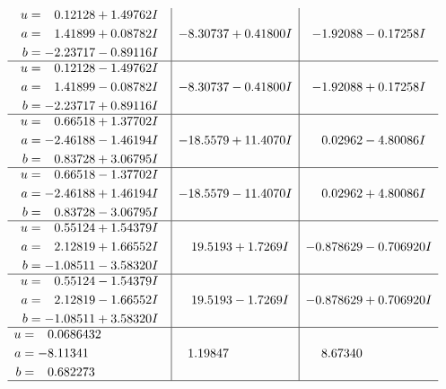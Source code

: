 \documentclass[1p]{elsarticle_modified}
\theoremstyle{definition}
\begin{document}
$$\begin{array}{c|c|c}
\begin{aligned}
u &= \phantom{-}0.12128 + 1.49762 I \\
a &= \phantom{-}1.41899 + 0.08782 I \\
b &= -2.23717 - 0.89116 I\end{aligned}
 & -8.30737 + 0.41800 I & -1.92088 - 0.17258 I \\ \hline\begin{aligned}
u &= \phantom{-}0.12128 - 1.49762 I \\
a &= \phantom{-}1.41899 - 0.08782 I \\
b &= -2.23717 + 0.89116 I\end{aligned}
 & -8.30737 - 0.41800 I & -1.92088 + 0.17258 I \\ \hline\begin{aligned}
u &= \phantom{-}0.66518 + 1.37702 I \\
a &= -2.46188 - 1.46194 I \\
b &= \phantom{-}0.83728 + 3.06795 I\end{aligned}
 & -18.5579 + 11.4070 I & \phantom{-}0.02962 - 4.80086 I \\ \hline\begin{aligned}
u &= \phantom{-}0.66518 - 1.37702 I \\
a &= -2.46188 + 1.46194 I \\
b &= \phantom{-}0.83728 - 3.06795 I\end{aligned}
 & -18.5579 - 11.4070 I & \phantom{-}0.02962 + 4.80086 I \\ \hline\begin{aligned}
u &= \phantom{-}0.55124 + 1.54379 I \\
a &= \phantom{-}2.12819 + 1.66552 I \\
b &= -1.08511 - 3.58320 I\end{aligned}
 & \phantom{-}19.5193 + 1.7269 I & -0.878629 - 0.706920 I \\ \hline\begin{aligned}
u &= \phantom{-}0.55124 - 1.54379 I \\
a &= \phantom{-}2.12819 - 1.66552 I \\
b &= -1.08511 + 3.58320 I\end{aligned}
 & \phantom{-}19.5193 - 1.7269 I & -0.878629 + 0.706920 I \\ \hline\begin{aligned}
u &= \phantom{-}0.0686432\phantom{ +0.000000I} \\
a &= -8.11341\phantom{ +0.000000I} \\
b &= \phantom{-}0.682273\phantom{ +0.000000I}\end{aligned}
 & \phantom{-}1.19847\phantom{ +0.000000I} & \phantom{-}8.67340\phantom{ +0.000000I}\\
 \hline 
 \end{array}$$\newpage\newpage\renewcommand{\arraystretch}{1}
\end{document}
